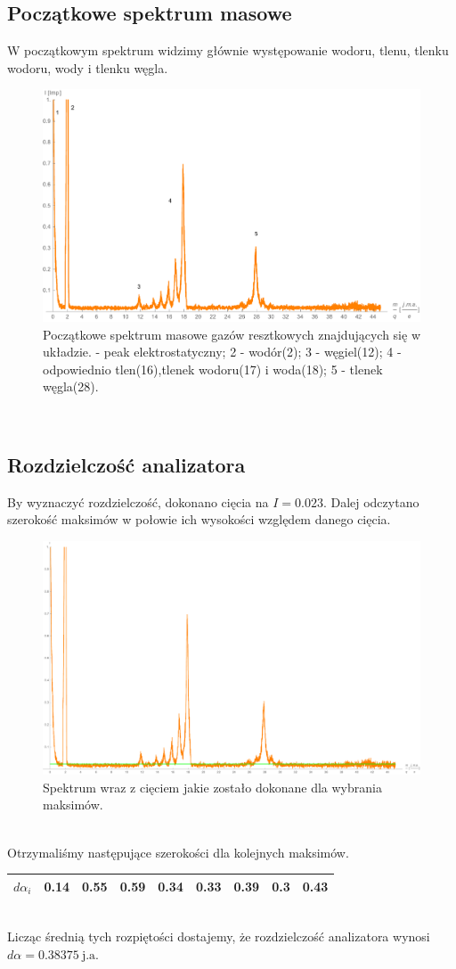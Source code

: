 \documentclass[paper=a4, fontsize=12pt]{scrartcl}
\begin{document}
\subsection{Początkowe spektrum masowe}
W początkowym spektrum widzimy głównie występowanie wodoru, tlenu, tlenku wodoru, wody i tlenku węgla.
\begin{figure}[h!]
	\centering
	\includegraphics[width=0.7\linewidth]{spekini}
	\caption{Początkowe spektrum masowe gazów resztkowych znajdujących się w układzie. - peak elektrostatyczny; 2 - wodór(2); 3 - węgiel(12); 4 - odpowiednio tlen(16),\newline tlenek wodoru(17) i woda(18); 5 - tlenek węgla(28).}
	\label{fig:spekini}
\end{figure}\\
\newpage
\subsection{Rozdzielczość analizatora}
By wyznaczyć rozdzielczość, dokonano cięcia na $I=0.023$. Dalej odczytano szerokość maksimów w połowie ich wysokości względem danego cięcia.
\begin{figure}[h!]
\centering
\includegraphics[width=0.7\linewidth]{spektcut}
\caption{Spektrum wraz z cięciem jakie zostało dokonane dla wybrania maksimów.}
\label{fig:spektcut}
\end{figure}\\
Otrzymaliśmy następujące szerokości dla kolejnych maksimów.
\begin{table}[h!]
	\begin{tabular}{|c|c|c|c|c|c|c|c|c|}\hline
$d\alpha_i$ & 0.14 & 0.55 & 0.59 & 0.34 & 0.33 & 0.39 & 0.3 & 0.43 \\\hline 
\end{tabular}
\end{table}\\
Licząc średnią tych rozpiętości dostajemy, że rozdzielczość analizatora wynosi $d\alpha=0.38375\:\mathrm{j.a.}$
\end{document}
